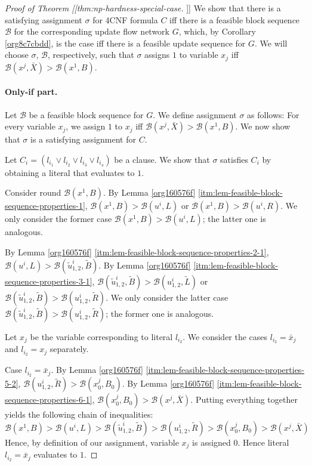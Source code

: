 \documentclass[fontsize=11pt,paper=a4]{book}
\begin{document}
\begin{proof}[Proof of Theorem [[thm:np-hardness-special-case]]]
We show that there is a satisfying assignment \(\sigma\) for 4CNF formula \(C\) iff there is a feasible block sequence \(\mathcal{B}\) for the corresponding update flow network \(G\), which, by Corollary \ref{org8c7cbdd}, is the case iff there is a feasible update sequence for \(G\).
We will choose \(\sigma\), \(\mathcal{B}\), respectively, such that \(\sigma\) assigns \(1\) to variable \(x_j\) iff \(\mathcal{B}(x^j,\bar{X})>\mathcal{B}(x^1,B)\).

\paragraph{Only-if part.}
Let \(\mathcal{B}\) be a feasible block sequence for \(G\).
We define assignment \(\sigma\) as follows:
For every variable \(x_j\), we assign \(1\) to \(x_j\) iff \(\mathcal{B}(x^j,\bar{X})>\mathcal{B}(x^1,B)\).
We now show that \(\sigma\) is a satisfying assignment for \(C\).

Let \(C_i=(l_{i_1}\vee l_{i_2}\vee l_{i_3}\vee l_{i_4})\) be a clause.
We show that \(\sigma\) satisfies \(C_i\) by obtaining a literal that evaluates to \(1\).

Consider round \(\mathcal{B}(x^1,B)\).
By Lemma \ref{org160576f} \ref{itm:lem-feasible-block-sequence-properties-1}, \(\mathcal{B}(x^1,B)>\mathcal{B}(u^i,L)\) or \(\mathcal{B}(x^1,B)>\mathcal{B}(u^i,R)\).
We only consider the former case \(\mathcal{B}(x^1,B)>\mathcal{B}(u^i,L)\); the latter one is analogous.

By Lemma \ref{org160576f} \ref{itm:lem-feasible-block-sequence-properties-2-1}, \(\mathcal{B}(u^i,L)>\mathcal{B}(\tilde{u}_{1,2}^i,\tilde{B})\).
By Lemma \ref{org160576f} \ref{itm:lem-feasible-block-sequence-properties-3-1}, \(\mathcal{B}(\tilde{u}_{1,2}^i,\tilde{B})>\mathcal{B}(u_{1,2}^i,\tilde{L})\) or \(\mathcal{B}(\tilde{u}_{1,2}^i,\tilde{B})>\mathcal{B}(u_{1,2}^i,\tilde{R})\).
We only consider the latter case \(\mathcal{B}(\tilde{u}_{1,2}^i,\tilde{B})>\mathcal{B}(u_{1,2}^i,\tilde{R})\); the former one is analogous.

Let \(x_j\) be the variable corresponding to literal \(l_{i_2}\).
We consider the cases \(l_{i_2}=\bar{x}_j\) and \(l_{i_2}=x_j\) separately.

Case \(l_{i_2}=\bar{x}_j\).
By Lemma \ref{org160576f} \ref{itm:lem-feasible-block-sequence-properties-5-2}, \(\mathcal{B}(u_{1,2}^i,\tilde{R})>\mathcal{B}(x_0^j,B_0)\).
By Lemma \ref{org160576f} \ref{itm:lem-feasible-block-sequence-properties-6-1}, \(\mathcal{B}(x_0^j,B_0)>\mathcal{B}(x^j,\bar{X})\).
Putting everything together yields the following chain of inequalities:
\[
\mathcal{B}(x^1,B)>
\mathcal{B}(u^i,L)>
\mathcal{B}(\tilde{u}_{1,2}^i,\tilde{B})>
\mathcal{B}(u_{1,2}^i,\tilde{R})>
\mathcal{B}(x_0^j,B_0)>
\mathcal{B}(x^j,\bar{X})
\]
Hence, by definition of our assignment, variable \(x_j\) is assigned \(0\).
Hence literal \(l_{i_2}=\bar{x}_j\) evaluates to \(1\).


\end{proof}
\end{document}

